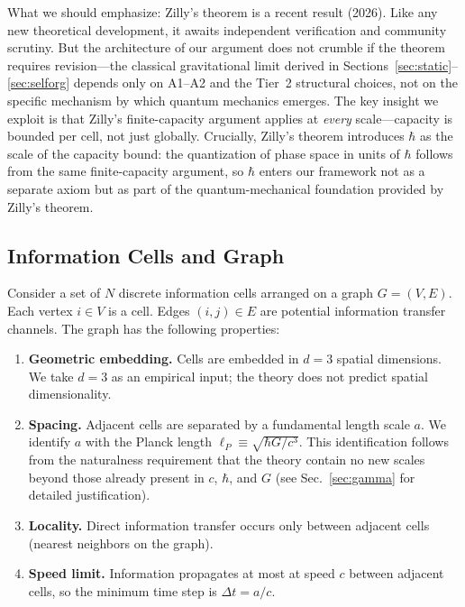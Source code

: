 \documentclass[aps,prd,twocolumn,showpacs,superscriptaddress,preprintnumbers]{revtex4-2}
\begin{document}
What we should emphasize: Zilly's theorem is a recent result (2026).
Like any new theoretical development, it awaits independent verification and community scrutiny.
But the architecture of our argument does not crumble if the theorem requires revision---the classical gravitational limit derived in Sections~\ref{sec:static}--\ref{sec:selforg} depends only on A1--A2 and the Tier~2 structural choices, not on the specific mechanism by which quantum mechanics emerges.
The key insight we exploit is that Zilly's finite-capacity argument applies at \emph{every} scale---capacity is bounded per cell, not just globally.
Crucially, Zilly's theorem introduces $\hbar$ as the scale of the capacity bound: the quantization of phase space in units of $\hbar$ follows from the same finite-capacity argument, so $\hbar$ enters our framework not as a separate axiom but as part of the quantum-mechanical foundation provided by Zilly's theorem.

\subsection{Information Cells and Graph}

Consider a set of $N$ discrete information cells arranged on a graph $G=(V,E)$.
Each vertex $i\in V$ is a cell.
Edges $(i,j)\in E$ are potential information transfer channels.
The graph has the following properties:

\begin{enumerate}
    \item \textbf{Geometric embedding.} Cells are embedded in $d=3$ spatial dimensions. We take $d=3$ as an empirical input; the theory does not predict spatial dimensionality.
    \item \textbf{Spacing.} Adjacent cells are separated by a fundamental length scale $a$. We identify $a$ with the Planck length $\ell_P\equiv\sqrt{\hbar G/c^3}$. This identification follows from the naturalness requirement that the theory contain no new scales beyond those already present in $c$, $\hbar$, and $G$ (see Sec.~\ref{sec:gamma} for detailed justification).
    \item \textbf{Locality.} Direct information transfer occurs only between adjacent cells (nearest neighbors on the graph).
    \item \textbf{Speed limit.} Information propagates at most at speed $c$ between adjacent cells, so the minimum time step is $\Delta t = a/c$.
\end{enumerate}
\end{document}
